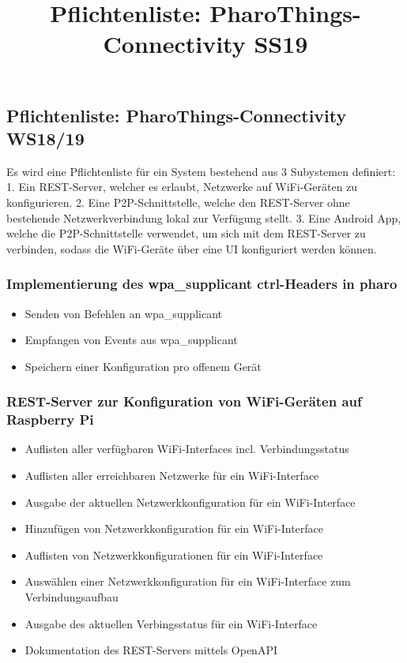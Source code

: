 \documentclass[12pt,a4paper]{article}
\title{Pflichtenliste: PharoThings-Connectivity SS19}
\begin{document}
\subsection*{Pflichtenliste: PharoThings-Connectivity WS18/19}
Es wird eine Pflichtenliste für ein System bestehend aus 3 Subystemen definiert:
1. Ein REST-Server, welcher es erlaubt, Netzwerke auf WiFi-Geräten zu konfigurieren.
2. Eine P2P-Schnittstelle, welche den REST-Server ohne bestehende Netzwerkverbindung lokal zur Verfügung stellt.
3. Eine Android App, welche die P2P-Schnittstelle verwendet, um sich mit dem REST-Server zu verbinden, sodass die WiFi-Geräte über eine UI konfiguriert werden können.

\subsubsection*{Implementierung des wpa\_supplicant ctrl-Headers in pharo}
	\begin{itemize}
	\item Senden von Befehlen an wpa\_supplicant
	\item Empfangen von Events aus wpa\_supplicant
	\item Speichern einer Konfiguration pro offenem Gerät
	\end{itemize}
\subsubsection*{REST-Server zur Konfiguration von WiFi-Geräten auf Raspberry Pi}
	\begin{itemize}
	\item Auflisten aller verfügbaren WiFi-Interfaces incl. Verbindungsstatus
	\item Auflisten aller erreichbaren Netzwerke für ein WiFi-Interface
	\item Ausgabe der aktuellen Netzwerkkonfiguration für ein WiFi-Interface
	\item Hinzufügen von Netzwerkkonfiguration für ein WiFi-Interface
	\item Auflisten von Netzwerkkonfigurationen für ein WiFi-Interface
	\item Auswählen einer Netzwerkkonfiguration für ein WiFi-Interface zum Verbindungsaufbau
	\item Ausgabe des aktuellen Verbingsstatus für ein WiFi-Interface
	\item Dokumentation des REST-Servers mittels OpenAPI
	\end{itemize}
\end{document}
